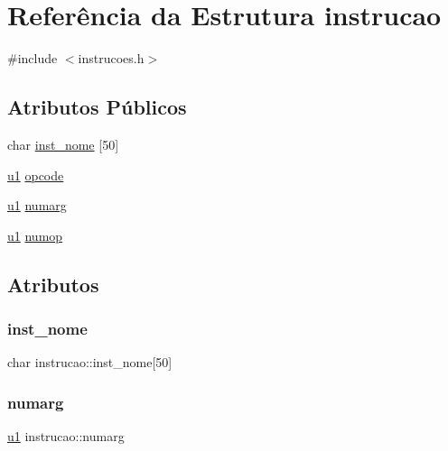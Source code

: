 \hypertarget{structinstrucao}{}\section{Referência da Estrutura instrucao}
\label{structinstrucao}


{\ttfamily \#include $<$instrucoes.\+h$>$}

\subsection*{Atributos Públicos}
\begin{DoxyCompactItemize}
\item 
char \hyperlink{structinstrucao_a848f2424a95f3d71ded0327a524446b8}{inst\+\_\+nome} \mbox{[}50\mbox{]}
\item 
\hyperlink{lista__operandos_8h_ad9f4cdb6757615aae2fad89dab3c5470}{u1} \hyperlink{structinstrucao_a6fab1343e02c9298bc65ce60976e41a0}{opcode}
\item 
\hyperlink{lista__operandos_8h_ad9f4cdb6757615aae2fad89dab3c5470}{u1} \hyperlink{structinstrucao_a59c5e317639fc03517361dd90678d239}{numarg}
\item 
\hyperlink{lista__operandos_8h_ad9f4cdb6757615aae2fad89dab3c5470}{u1} \hyperlink{structinstrucao_ae1e28e385eb8ef40eba3918cd8f458d0}{numop}
\end{DoxyCompactItemize}


\subsection{Atributos}
\mbox{\label{structinstrucao_a848f2424a95f3d71ded0327a524446b8}} 
\subsubsection{\texorpdfstring{inst\+\_\+nome}{inst\_nome}}
{\footnotesize\ttfamily char instrucao\+::inst\+\_\+nome\mbox{[}50\mbox{]}}

\mbox{\label{structinstrucao_a59c5e317639fc03517361dd90678d239}} 
\subsubsection{\texorpdfstring{numarg}{numarg}}
{\footnotesize\ttfamily \hyperlink{lista__operandos_8h_ad9f4cdb6757615aae2fad89dab3c5470}{u1} instrucao\+::numarg}

